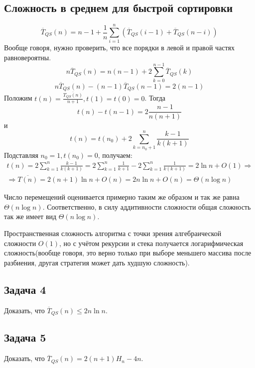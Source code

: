 \documentclass[11pt]{article}
\begin{document}
\subsection{Сложность в среднем для быстрой сортировки}
\label{sec:org7334f49}
   \begin{equation}
\overline{T}_{QS}(n) = n - 1 + \frac1n\sum_{i = 1}^n\left(\overline{T}_{QS}(i - 1) +
\overline{T}_{QS}(n - i)\right)
   \end{equation}
Вообще говоря, нужно проверить, что все порядки в левой и правой частях равновероятны.
\begin{equation}
n\overline{T}_{QS}(n) = n(n - 1) + 2\sum_{k = 0}^{n - 1}\overline{T}_{QS}(k)
\end{equation}
\begin{equation}
n\overline{T}_{QS}(n) - (n - 1)\overline{T}_{QS}(n - 1) = 2(n - 1)
\end{equation}
Положим $t(n) = \frac{\overline{T_{QS}(n)}}{n + 1}, t(1) = t(0) = 0$. Тогда
\begin{equation}
t(n) - t(n - 1) = 2\frac{n - 1}{n(n + 1)}
\end{equation}
и
\begin{equation}
t(n) = t(n_0) + 2\sum_{k = n_0 + 1}^n\frac{k - 1}{k(k + 1)}
\end{equation}
Подставляя $n_0 = 1, t(n_0) = 0$, получаем:
\begin{multline}
t(n) = 2\sum_{k = 1}^n\frac{k - 1}{k(k + 1)} = 2\sum_{k = 1}^n\frac1{k + 1} - 2\sum_{k = 1}^n\frac1{k(k + 1)}
= 2\ln n + O(1) \Rightarrow \\
\Rightarrow \overline{T(n)} = 2(n + 1)\ln n + O(n) = 2n\ln n + O(n) = \Theta(n\log n)
\end{multline}

Число перемещений оценивается примерно таким же образом и так же равна \(\Theta(n\log n)\).
Соответственно, в силу аддитивности сложности общая сложность так же имеет вид \(\Theta(n\log n)\).

Пространственная сложность алгоритма с точки зрения алгебраической сложности \(O(1)\), но с
учётом рекурсии и стека получается логарифмическая сложность(вообще говоря, это верно только
при выборе меньшего массива после разбиения, другая стратегия может дать худшую сложность).
\subsection{Задача 4}
\label{sec:orgc83fe9c}
Доказать, что \(\overline{T}_{QS}(n) \leq 2n\ln n\).
\subsection{Задача 5}
\label{sec:org5ed10f3}
Доказать, что \(\overline{T}_{QS}(n) = 2(n + 1)H_n - 4n\).
\end{document}
